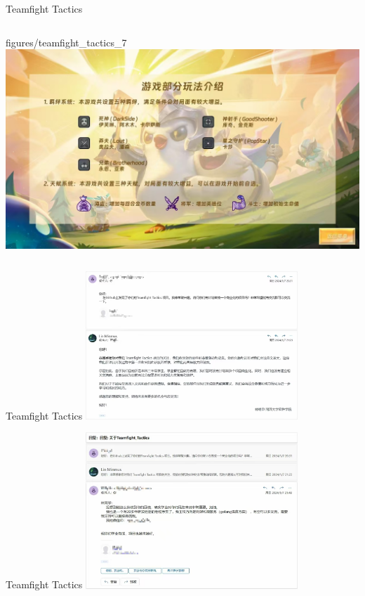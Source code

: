 \documentclass{beamer}
\begin{document}
\begin{frame}[fragile]{Teamfight Tactics}
\begin{columns}
\begin{column}{0.4\textwidth}
{figures/teamfight_tactics_7}
\includegraphics[width=\textwidth]
{figures/teamfight_tactics_8}
\end{column}
\end{columns}
\end{frame}


\begin{frame}[fragile]{Teamfight Tactics}
\includegraphics[width=0.6\textwidth]
{figures/email_1}
\end{frame}


\begin{frame}[fragile]{Teamfight Tactics}
\includegraphics[width=0.6\textwidth]
{figures/email_2}
\end{frame}
\end{document}
